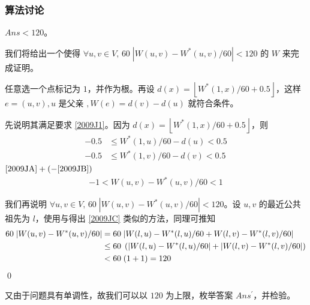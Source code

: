 			\subsubsection{算法讨论}	
				\begin{theorem}
					$Ans < 120$。
				\end{theorem}
				\begin{pf}
					我们将给出一个使得 $\forall u, v \in V,\,  60\; |W(u, v) - W^*(u, v) / 60 | < 120$ 的 $W$ 来完成证明。
					
					任意选一个点标记为 $1$，并作为根。再设 $d(x) =\left\lfloor W^*(1, x) / 60 + 0.5 \right\rfloor$，这样 $e = (u, v), u $ 是父亲 $, W(e) = d(v) - d(u)$ 就符合条件。
					
					先说明其满足要求  \eqref{2009J1}。因为  $d(x) =\left\lfloor W^*(1, x) / 60 + 0.5 \right\rfloor$，则
					\begin{align}
						- 0.5 & \le W^*(1, u)  / 60 - d(u) <0.5 \label{2009JA} \\
						- 0.5 & \le W^*(1, v)  / 60 - d(v) < 0.5 \label{2009JB}
					\end{align}
					$\eqref{2009JA}  + (- \eqref{2009JB})$
					\begin{align}
						-1  < W(u, v) - W^*(u, v) / 60 < 1 \label{2009JC} 
					\end{align}
				
					我们再说明  $\forall u, v \in V, \, 60\; |W(u, v) - W^*(u, v) / 60 | < 120$。设 $u, v$ 的最近公共祖先为 $l$，使用与得出 \eqref{2009JC} 类似的方法，同理可推知
					\begin{align}
						60\; |W(u, v) - W^*(u, v) / 60| & = 60\; |W(l, u) - W^*(l, u) / 60 + W(l, v)  - W^*(l, v) / 60|
						\notag \\
							& \le
							60 \;\left( |W(l, u) - W^*(l, u) / 60| + |W(l, v)  - W^*(l, v) / 60| \right)\notag \\
							& < 60 \;(1 + 1)=  120
					\end{align} \qed
					
				\end{pf}
				又由于问题具有单调性，故我们可以以 $120$ 为上限，枚举答案 $Ans^\prime$，并检验。
				
